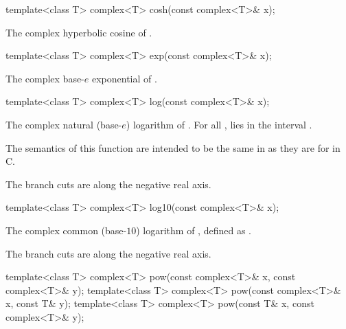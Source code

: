 %
\begin{itemdecl}
template<class T> complex<T> cosh(const complex<T>& x);
\end{itemdecl}

\begin{itemdescr}
\pnum
\returns
The complex hyperbolic cosine of .
\end{itemdescr}

%
\begin{itemdecl}
template<class T> complex<T> exp(const complex<T>& x);
\end{itemdecl}

\begin{itemdescr}
\pnum
\returns
The complex base-$e$ exponential of .
\end{itemdescr}

%
\begin{itemdecl}
template<class T> complex<T> log(const complex<T>& x);
\end{itemdecl}

\begin{itemdescr}
\pnum
\returns
The complex natural (base-$e$) logarithm of . For all ,
 lies in the interval \crange{$-\pi$}{$\pi$}.
\begin{note}
The semantics of this function are intended to be the same in \Cpp{}
as they are for  in C.
\end{note}

\pnum
\remarks
The branch cuts are along the negative real axis.
\end{itemdescr}

%
\begin{itemdecl}
template<class T> complex<T> log10(const complex<T>& x);
\end{itemdecl}

\begin{itemdescr}
\pnum
\returns
The complex common (base-$10$) logarithm of , defined as
.

\pnum
\remarks
The branch cuts are along the negative real axis.
\end{itemdescr}

%
\begin{itemdecl}
template<class T> complex<T> pow(const complex<T>& x, const complex<T>& y);
template<class T> complex<T> pow(const complex<T>& x, const T& y);
template<class T> complex<T> pow(const T& x, const complex<T>& y);
\end{itemdecl}

